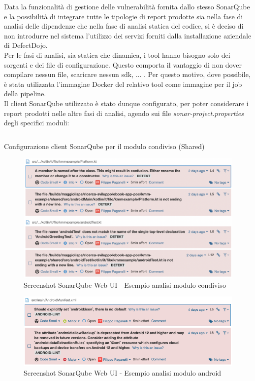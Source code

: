 Data la funzionalità di gestione delle vulnerabilità fornita dallo stesso SonarQube e la possibilità di integrare tutte le tipologie di report prodotte sia nella fase di analisi delle dipendenze che nella fase di analisi statica del codice, si è deciso di non introdurre nel sistema l'utilizzo dei servizi forniti dalla installazione aziendale di DefectDojo.\\
Per le fasi di analisi, sia statica che dinamica, i tool hanno bisogno solo dei sorgenti e dei file di configurazione. Questo comporta il vantaggio di non dover compilare nessun file, scaricare nessun sdk, ... . Per questo motivo, dove possibile, è stata utilizzata l'immagine Docker del relativo tool come immagine per il job della pipeline.\\
Il client SonarQube utilizzato è stato dunque configurato, per poter considerare i report prodotti nelle altre fasi di analisi, agendo sui file \textit{sonar-project.properties} degli specifici moduli:
\begin{listing}[H]
\inputminted{kotlin}{code/4-sonarplugin}
\caption{Configurazione client SonarQube per il modulo condiviso (Shared)}
\end{listing}
\begin{figure}[H]
\centering
\includegraphics[width=1\textwidth]{img/Screenshot 2022-06-19 at 15.33.37.png}
\caption{Screenshot SonarQube Web UI - Esempio analisi modulo condiviso}
\end{figure}
\begin{figure}[H]
\centering
\includegraphics[width=1\textwidth]{img/Screenshot 2022-06-21 at 09.58.58.png}
\caption{Screenshot SonarQube Web UI - Esempio analisi modulo android}
\end{figure}

